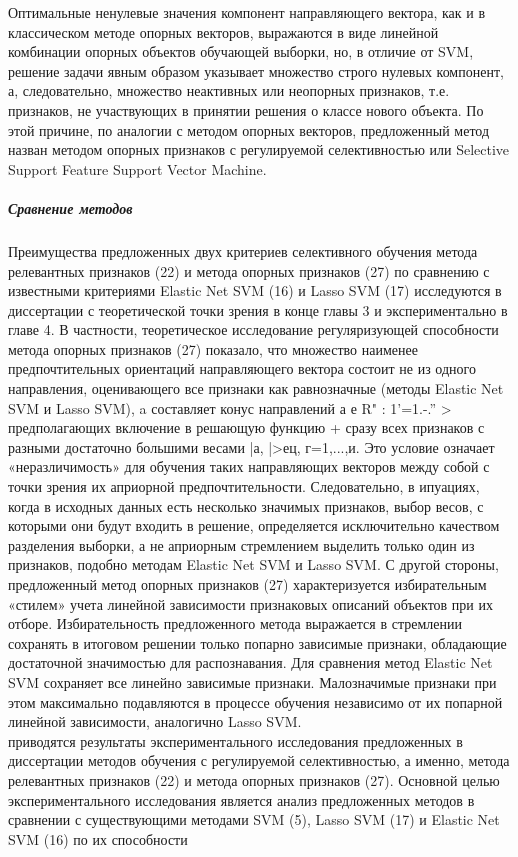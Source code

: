 \documentclass[../body.tex]{subfiles}
\begin{document}
{		Оптимальные ненулевые значения компонент направляющего вектора, как и в классическом методе опорных векторов, выражаются в виде линейной комбинации опорных объектов обучающей выборки, но, в отличие от SVM, решение задачи явным образом указывает множество строго нулевых компонент, а, следовательно, множество неактивных или неопорных признаков, т.е. признаков, не участвующих
		в принятии решения о классе нового объекта. По этой причине, по аналогии с методом
		опорных векторов, предложенный метод назван  методом опорных признаков
		с регулируемой селективностью или Selective Support Feature Support Vector Machine. 
		
		\subparagraph{Сравнение методов}
		Преимущества предложенных двух критериев селективного обучения метода релевантных признаков (22) и метода опорных признаков (27) по сравнению с известными критериями Elastic Net SVM (16) и Lasso SVM (17) исследуются в диссертации с теоретической точки зрения в конце главы 3 и экспериментально в главе 4.
		В частности, теоретическое исследование регуляризующей способности метода опорных признаков (27) показало, что множество наименее предпочтительных ориентаций
		направляющего вектора состоит не из одного направления, оценивающего все признаки
		как равнозначные (методы Elastic Net SVM и Lasso SVM), a составляет конус направлений
		{а е R" : 1'=1.-.'' } > предполагающих включение в решающую функцию
		+ сразу всех признаков с разными достаточно большими весами |а, |>ец, г=1,...,и.
		Это условие означает «неразличимость» для обучения таких направляющих векторов между собой с точки зрения их априорной предпочтительности. Следовательно, в ипуациях,
		когда в исходных данных есть несколько значимых признаков, выбор весов, с которыми
		они будут входить в решение, определяется исключительно качеством разделения выборки, а не априорным стремлением выделить только один из признаков, подобно методам
		Elastic Net SVM и Lasso SVM.
		С другой стороны, предложенный метод опорных признаков (27) характеризуется избирательным «стилем» учета линейной зависимости признаковых описаний объектов при
		их отборе. Избирательность предложенного метода выражается в стремлении сохранять в
		итоговом решении только попарно зависимые признаки, обладающие достаточной значимостью для распознавания. Для сравнения метод Elastic Net SVM сохраняет все линейно
		зависимые признаки. Малозначимые признаки при этом максимально подавляются в процессе обучения независимо от их попарной линейной зависимости, аналогично Lasso SVM.
		\\
		приводятся результаты экспериментального исследования предложенных в диссертации методов обучения с регулируемой селективностью, а именно, метода релевантных признаков (22) и метода опорных признаков (27). Основной целью экспериментального исследования является анализ предложенных методов в сравнении с существующими методами SVM (5), Lasso SVM (17) и Elastic Net SVM (16) по их способности
}
\end{document}
